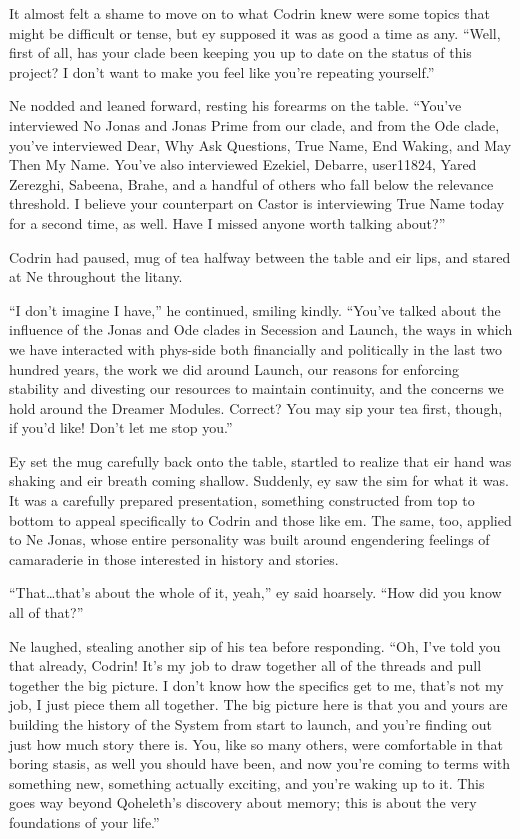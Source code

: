 It almost felt a shame to move on to what Codrin knew were some topics that might be difficult or tense, but ey supposed it was as good a time as any. ``Well, first of all, has your clade been keeping you up to date on the status of this project? I don't want to make you feel like you're repeating yourself.''

Ne nodded and leaned forward, resting his forearms on the table. ``You've interviewed No Jonas and Jonas Prime from our clade, and from the Ode clade, you've interviewed Dear, Why Ask Questions, True Name, End Waking, and May Then My Name. You've also interviewed Ezekiel, Debarre, user11824, Yared Zerezghi, Sabeena, Brahe, and a handful of others who fall below the relevance threshold. I believe your counterpart on Castor is interviewing True Name today for a second time, as well. Have I missed anyone worth talking about?''

Codrin had paused, mug of tea halfway between the table and eir lips, and stared at Ne throughout the litany.

``I don't imagine I have,'' he continued, smiling kindly. ``You've talked about the influence of the Jonas and Ode clades in Secession and Launch, the ways in which we have interacted with phys-side both financially and politically in the last two hundred years, the work we did around Launch, our reasons for enforcing stability and divesting our resources to maintain continuity, and the concerns we hold around the Dreamer Modules. Correct? You may sip your tea first, though, if you'd like! Don't let me stop you.''

Ey set the mug carefully back onto the table, startled to realize that eir hand was shaking and eir breath coming shallow. Suddenly, ey saw the sim for what it was. It was a carefully prepared presentation, something constructed from top to bottom to appeal specifically to Codrin and those like em. The same, too, applied to Ne Jonas, whose entire personality was built around engendering feelings of camaraderie in those interested in history and stories.

``That\ldots that's about the whole of it, yeah,'' ey said hoarsely. ``How did you know all of that?''

Ne laughed, stealing another sip of his tea before responding. ``Oh, I've told you that already, Codrin! It's my job to draw together all of the threads and pull together the big picture. I don't know how the specifics get to me, that's not my job, I just piece them all together. The big picture here is that you and yours are building the history of the System from start to launch, and you're finding out just how much story there is. You, like so many others, were comfortable in that boring stasis, as well you should have been, and now you're coming to terms with something new, something actually exciting, and you're waking up to it. This goes way beyond Qoheleth's discovery about memory; this is about the very foundations of your life.''

